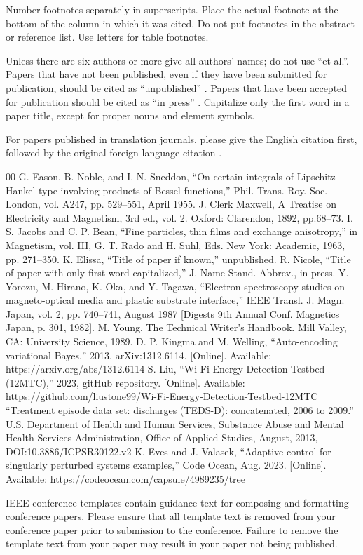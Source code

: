 Number footnotes separately in superscripts. Place the actual footnote at 
the bottom of the column in which it was cited. Do not put footnotes in the 
abstract or reference list. Use letters for table footnotes.

Unless there are six authors or more give all authors' names; do not use 
``et al.''. Papers that have not been published, even if they have been 
submitted for publication, should be cited as ``unpublished'' \cite{b4}. Papers 
that have been accepted for publication should be cited as ``in press'' \cite{b5}. 
Capitalize only the first word in a paper title, except for proper nouns and 
element symbols.

For papers published in translation journals, please give the English 
citation first, followed by the original foreign-language citation \cite{b6}.

\begin{thebibliography}{00}
 G. Eason, B. Noble, and I. N. Sneddon, ``On certain integrals of Lipschitz-Hankel type involving products of Bessel functions,'' Phil. Trans. Roy. Soc. London, vol. A247, pp. 529--551, April 1955.
 J. Clerk Maxwell, A Treatise on Electricity and Magnetism, 3rd ed., vol. 2. Oxford: Clarendon, 1892, pp.68--73.
 I. S. Jacobs and C. P. Bean, ``Fine particles, thin films and exchange anisotropy,'' in Magnetism, vol. III, G. T. Rado and H. Suhl, Eds. New York: Academic, 1963, pp. 271--350.
 K. Elissa, ``Title of paper if known,'' unpublished.
 R. Nicole, ``Title of paper with only first word capitalized,'' J. Name Stand. Abbrev., in press.
 Y. Yorozu, M. Hirano, K. Oka, and Y. Tagawa, ``Electron spectroscopy studies on magneto-optical media and plastic substrate interface,'' IEEE Transl. J. Magn. Japan, vol. 2, pp. 740--741, August 1987 [Digests 9th Annual Conf. Magnetics Japan, p. 301, 1982].
 M. Young, The Technical Writer's Handbook. Mill Valley, CA: University Science, 1989.
 D. P. Kingma and M. Welling, ``Auto-encoding variational Bayes,'' 2013, arXiv:1312.6114. [Online]. Available: https://arxiv.org/abs/1312.6114
 S. Liu, ``Wi-Fi Energy Detection Testbed (12MTC),'' 2023, gitHub repository. [Online]. Available: https://github.com/liustone99/Wi-Fi-Energy-Detection-Testbed-12MTC
 ``Treatment episode data set: discharges (TEDS-D): concatenated, 2006 to 2009.'' U.S. Department of Health and Human Services, Substance Abuse and Mental Health Services Administration, Office of Applied Studies, August, 2013, DOI:10.3886/ICPSR30122.v2
 K. Eves and J. Valasek, ``Adaptive control for singularly perturbed systems examples,'' Code Ocean, Aug. 2023. [Online]. Available: https://codeocean.com/capsule/4989235/tree
\end{thebibliography}

\vspace{12pt}
\color{red}
IEEE conference templates contain guidance text for composing and formatting conference papers. Please ensure that all template text is removed from your conference paper prior to submission to the conference. Failure to remove the template text from your paper may result in your paper not being published.
